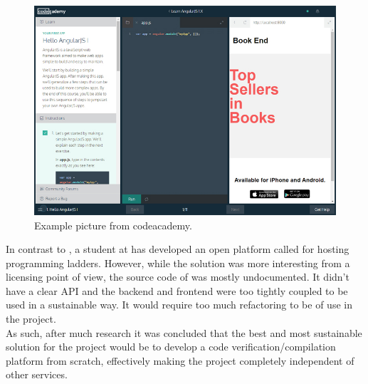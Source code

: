 \begin{figure}[h]
   \centering
    \includegraphics[width=.75\linewidth]{img/codeacademy_code.jpg}
    \caption{Example picture from codeacademy.}
\end{figure}


In contrast to \techio{}, a student at \LTU{} has developed an open platform called \sockr{} for hosting programming ladders. However, while the solution was more interesting from a licensing point of view, the source code of \sockr{} was mostly undocumented. It didn't have a clear API and the backend and frontend were too tightly coupled to be used in a sustainable way. It would require too much refactoring to be of use in the project.\\

As such, after much research it was concluded that the best and most sustainable solution for the project would be to develop a code verification/compilation platform from scratch, effectively making the project completely independent of other services.
